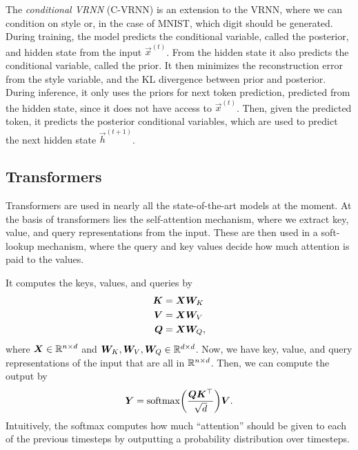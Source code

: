 The \textit{conditional VRNN} (C-VRNN) is an extension to the VRNN, where we can condition on \eg
style or, in the case of MNIST, which digit should be generated. During training, the model
predicts the conditional variable, called the posterior, and hidden state from the input
$\vec{x}^{(t)}$. From the hidden state it also predicts the conditional variable, called the prior.
It then minimizes the reconstruction error from the style variable, and the KL divergence between
prior and posterior. During inference, it only uses the priors for next token prediction, predicted
from the hidden state, since it does not have access to $\vec{x}^{(t)}$. Then, given the predicted
token, it predicts the posterior conditional variables, which are used to predict the next hidden
state $\vec{h}^{(t+1)}$.

\subsection{Transformers}

Transformers \citep{vaswani2017attention} are used in nearly all the state-of-the-art models at the
moment. At the basis of transformers lies the self-attention mechanism, where we extract key,
value, and query representations from the input. These are then used in a soft-lookup mechanism,
where the query and key values decide how much attention is paid to the values.

It computes the keys, values, and queries by
\begin{align*}
    \bm{K} & = \bm{X} \bm{W}_K  \\
    \bm{V} & = \bm{X} \bm{W}_V  \\
    \bm{Q} & = \bm{X} \bm{W}_Q,
\end{align*}
where $\bm{X} \in \mathbb{R}^{n\times d}$ and $\bm{W}_K,\bm{W}_V,\bm{W}_Q \in \mathbb{R}^{d\times d}$. Now, we have
key, value, and query representations of the input that are all in $\mathbb{R}^{n \times d}$. Then, we can
compute the output by \[
    \mat{Y} = \mathrm{softmax}\lft( \frac{\mat{Q} \transpose{\mat{K}}}{\sqrt{d}} \rgt) \mat{V}.
\]
Intuitively, the softmax computes how much ``attention'' should be given to each of the previous
timesteps by outputting a probability distribution over timesteps.

